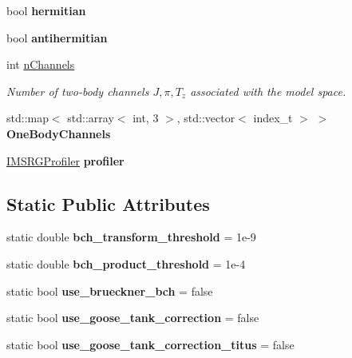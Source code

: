 \begin{DoxyCompactItemize}
\mbox{\label{classOperator_ad46a54204c51cf5c82e4c489217bd2c1}} 
bool {\bfseries hermitian}
\item 
\mbox{\label{classOperator_a86dd30fca215948dd9307fa45b7a2e32}} 
bool {\bfseries antihermitian}
\item 
\mbox{\label{classOperator_a710cd3c6107a4497e90a04c1f3d2b15f}} 
int \hyperlink{classOperator_a710cd3c6107a4497e90a04c1f3d2b15f}{n\+Channels}
\begin{DoxyCompactList}\small\item\em Number of two-\/body channels $ J,\pi,T_z $ associated with the model space. \end{DoxyCompactList}\item 
\mbox{\label{classOperator_a7ffa804d606e37d2e00ae03fb13186a7}} 
std\+::map$<$ std\+::array$<$ int, 3 $>$, std\+::vector$<$ index\+\_\+t $>$ $>$ {\bfseries One\+Body\+Channels}
\item 
\mbox{\label{classOperator_a9bc51c77e4b73736241fd8cedea05cc3}} 
\hyperlink{classIMSRGProfiler}{I\+M\+S\+R\+G\+Profiler} {\bfseries profiler}
\end{DoxyCompactItemize}
\subsection*{Static Public Attributes}
\begin{DoxyCompactItemize}
\item 
\mbox{\label{classOperator_af4743d3c6e99ebf1915b348447c8e688}} 
static double {\bfseries bch\+\_\+transform\+\_\+threshold} = 1e-\/9
\item 
\mbox{\label{classOperator_ad4a2ba438f3286ef22cc06b61f745993}} 
static double {\bfseries bch\+\_\+product\+\_\+threshold} = 1e-\/4
\item 
\mbox{\label{classOperator_a70e74e9e54e0f21a64c6ba8b1e476fdd}} 
static bool {\bfseries use\+\_\+brueckner\+\_\+bch} = false
\item 
\mbox{\label{classOperator_a3c7ae7a267c1c9d48655012a16c68b29}} 
static bool {\bfseries use\+\_\+goose\+\_\+tank\+\_\+correction} = false
\item 
\mbox{\label{classOperator_a2aba150753edf7d54789f243e1978823}} 
static bool {\bfseries use\+\_\+goose\+\_\+tank\+\_\+correction\+\_\+titus} = false
\end{DoxyCompactItemize}
